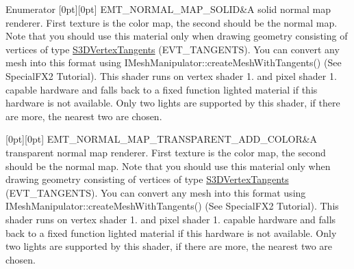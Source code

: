 \begin{DoxyEnumFields}{Enumerator}
[0pt][0pt]{}\mbox{\label{namespaceirr_1_1video_ac8e9b6c66f7cebabd1a6d30cbc5430f1a6db87c5d5200c00419052ee6d80fb4ca}} 
E\+M\+T\+\_\+\+N\+O\+R\+M\+A\+L\+\_\+\+M\+A\+P\+\_\+\+S\+O\+L\+ID&A solid normal map renderer. First texture is the color map, the second should be the normal map. Note that you should use this material only when drawing geometry consisting of vertices of type \hyperlink{structirr_1_1video_1_1S3DVertexTangents}{S3\+D\+Vertex\+Tangents} (E\+V\+T\+\_\+\+T\+A\+N\+G\+E\+N\+TS). You can convert any mesh into this format using I\+Mesh\+Manipulator\+::create\+Mesh\+With\+Tangents() (See Special\+F\+X2 Tutorial). This shader runs on vertex shader 1. and pixel shader 1. capable hardware and falls back to a fixed function lighted material if this hardware is not available. Only two lights are supported by this shader, if there are more, the nearest two are chosen. \\
\hline

[0pt][0pt]{}\mbox{\label{namespaceirr_1_1video_ac8e9b6c66f7cebabd1a6d30cbc5430f1a78c15ca7cf73482e9af07a20f3eefd85}} 
E\+M\+T\+\_\+\+N\+O\+R\+M\+A\+L\+\_\+\+M\+A\+P\+\_\+\+T\+R\+A\+N\+S\+P\+A\+R\+E\+N\+T\+\_\+\+A\+D\+D\+\_\+\+C\+O\+L\+OR&A transparent normal map renderer. First texture is the color map, the second should be the normal map. Note that you should use this material only when drawing geometry consisting of vertices of type \hyperlink{structirr_1_1video_1_1S3DVertexTangents}{S3\+D\+Vertex\+Tangents} (E\+V\+T\+\_\+\+T\+A\+N\+G\+E\+N\+TS). You can convert any mesh into this format using I\+Mesh\+Manipulator\+::create\+Mesh\+With\+Tangents() (See Special\+F\+X2 Tutorial). This shader runs on vertex shader 1. and pixel shader 1. capable hardware and falls back to a fixed function lighted material if this hardware is not available. Only two lights are supported by this shader, if there are more, the nearest two are chosen. \\
\hline


\end{DoxyEnumFields}
